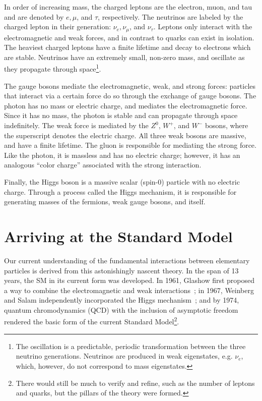 In order of increasing mass, the charged leptons are the electron, muon, and tau and are denoted by $e,\mu$, and $\tau$, respectively. The neutrinos are labeled by the charged lepton in their generation: $\nu_e,\nu_{\mu}$, and $\nu_{\tau}$. 
Leptons only interact with the electromagnetic and weak forces, and in contrast to quarks can exist in isolation. The heaviest charged leptons have a finite lifetime and decay to electrons which are stable. Neutrinos have an extremely small, non-zero mass, and oscillate as they propagate through space\footnote{
	The oscillation is a predictable, periodic transformation between the three neutrino generations. Neutrinos are produced in weak eigenstates, e.g. $\nu_e$, which, however, do not correspond to mass eigenstates.
}. 

The gauge bosons mediate the electromagnetic, weak, and strong forces: particles that interact via a certain force do so through the exchange of gauge bosons. The photon has no mass or electric charge, and mediates the electromagnetic force. Since it has no mass, the photon is stable and can propagate through space indefinitely. The weak force is mediated by the $Z^0$, $W^+$, and $W^-$ bosons, where the superscript denotes the electric charge. All three weak bosons are massive, and have a finite lifetime. The gluon is responsible for mediating the strong force. Like the photon, it is massless and has no electric charge; however, it has an analogous ``color charge'' associated with the strong interaction. 

Finally, the Higgs boson is a massive scalar (spin-0) particle with no electric charge. Through a process called the Higgs mechanism, it is responsible for generating masses of the fermions, weak gauge bosons, and itself.  


%
\iffalse
\section{Arriving at the Standard Model}

Our current understanding of the fundamental interactions between elementary particles is derived from this astonishingly nascent theory. In the span of 13 years, the SM in its current form was developed. In 1961, Glashow first proposed a way to combine the electromagnetic and weak interactions~\cite{Glashow:1961tr}; in 1967, Weinberg and Salam independently incorporated the Higgs mechanism~\cite{Weinberg,Salam:1968rm}; and by 1974, quantum chromodynamics (QCD) with the inclusion of asymptotic freedom~\cite{Gross_Wilczek, Politzer} rendered the basic form of the current Standard Model\footnote{
	There would still be much to verify and refine, such as the number of leptons and quarks, but the pillars of the theory were formed. 
}. 

